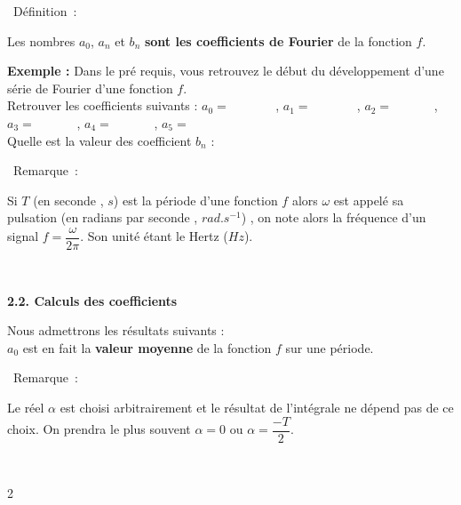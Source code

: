 \documentclass[11pt,a4paper]{article}
\newcommand{\rem}[1]
{\begin{bclogo}[couleur = white,logo=\bcinfo , arrondi = 0.1]
{~Remarque~:}
~~
{#1}
~~
\end{bclogo}}
\newcommand{\bdef}[1]
{\begin{bclogo}[couleur = white,logo=\bcinfo , arrondi = 0.1]
{~Définition~:}
~~
{#1}
~~
\end{bclogo}}
\begin{document}
\bdef{
\vspace{5cm}
}

Les nombres $a_0$, $a_n$ et $b_n$ \textbf{sont les coefficients de Fourier } de la fonction $f$.

\textbf{Exemple :} Dans le pré requis, vous retrouvez le début du développement d'une série de Fourier d'une fonction $f$. \\

Retrouver les coefficients suivants : $a_0=$ ~~~~~~ , $a_1=$ ~~~~~~ , $a_2=$ ~~~~~~, $a_3=$ ~~~~~~, $a_4=$ ~~~~~~, $a_5=$ ~~ \\[3mm]

Quelle est la valeur des coefficient $b_n$ : \dotfill

\rem{ Si $T$ (en seconde , $s$) est la période d'une fonction $f$ alors $\omega$ est appelé sa pulsation (en radians par seconde , $rad.s^{-1}$) , on note alors la fréquence d'un signal $f=\dfrac{\omega}{2\pi}$. Son unité étant le Hertz ($Hz$).

}

\begin{mybox}
    \textbf{2.2. Calculs des coefficients}
\end{mybox}


Nous admettrons les résultats suivants : \\[3mm]
$a_0$ est en fait la \textbf{valeur moyenne} de la fonction $f$ sur une période.
\vspace{3mm}

\rem{Le réel $\alpha$ est choisi arbitrairement et le résultat de l'intégrale ne dépend pas de ce choix. On prendra le plus souvent $\alpha = 0$ ou $\alpha = \dfrac{-T}{2}.$

}


\vspace{0.3cm}

\begin{multicols}{2}
\begin{center}
    

	 \\
	 \\
\end{center}\end{multicols}

\vspace{0.5cm}
\end{document}
